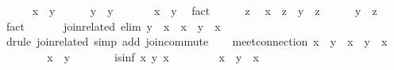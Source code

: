 \begin{isabellebody}
\ \ \ \ \isamarkupfalse%
\ {\isachardoublequoteopen}x\ {\isasymsqsubseteq}\ y{\isachardoublequoteclose}\isanewline
\ \ \ \ \isamarkupfalse%
\ {\isachardoublequoteopen}y\ {\isasymsqsubseteq}\ y{\isachardoublequoteclose}\ \isacommand{{\isachardot}{\isachardot}}\isamarkupfalse%
\isanewline
\ \ \ \ \isamarkupfalse%
\ {\isachardoublequoteopen}x\ {\isasymsqsubseteq}\ y{\isachardoublequoteclose}\ \isamarkupfalse%
\ fact\isanewline
\ \ \ \ \isamarkupfalse%
\ z\ \isamarkupfalse%
\ {\isachardoublequoteopen}x\ {\isasymsqsubseteq}\ z{\isachardoublequoteclose}\ \ {\isachardoublequoteopen}y\ {\isasymsqsubseteq}\ z{\isachardoublequoteclose}\isanewline
\ \ \ \ \isamarkupfalse%
\ {\isachardoublequoteopen}y\ {\isasymsqsubseteq}\ z{\isachardoublequoteclose}\ \isamarkupfalse%
\ fact\isanewline
\ \ \isamarkupfalse%
\isanewline
\isanewline
\ \ \isamarkupfalse%
\ join{\isacharunderscore}related{}\ {\isacharbrackleft}elim{\isacharquery}{\isacharbrackright}{\isacharcolon}\ {\isachardoublequoteopen}y\ {\isasymsqsubseteq}\ x\ {\isasymLongrightarrow}\ x\ {\isasymsqunion}\ y\ {\isacharequal}\ x{\isachardoublequoteclose}\isanewline
\ \ \ \ \isamarkupfalse%
\ {\isacharparenleft}drule\ join{\isacharunderscore}related{\isacharparenright}\ {\isacharparenleft}simp\ add{\isacharcolon}\ join{\isacharunderscore}commute{\isacharparenright}\isanewline
\isanewline
\ \ \isamarkupfalse%
\ meet{\isacharunderscore}connection{\isacharcolon}\ {\isachardoublequoteopen}{\isacharparenleft}x\ {\isasymsqsubseteq}\ y{\isacharparenright}\ {\isacharequal}\ {\isacharparenleft}x\ {\isasymsqinter}\ y\ {\isacharequal}\ x{\isacharparenright}{\isachardoublequoteclose}\isanewline
\ \ \isamarkupfalse%
\isanewline
\ \ \ \ \isamarkupfalse%
\ {\isachardoublequoteopen}x\ {\isasymsqsubseteq}\ y{\isachardoublequoteclose}\isanewline
\ \ \ \ \isamarkupfalse%
\ \isamarkupfalse%
\ {\isachardoublequoteopen}is{\isacharunderscore}inf\ x\ y\ x{\isachardoublequoteclose}\ \isacommand{{\isachardot}{\isachardot}}\isamarkupfalse%
\isanewline
\ \ \ \ \isamarkupfalse%
\ \isamarkupfalse%
\ {\isachardoublequoteopen}x\ {\isasymsqinter}\ y\ {\isacharequal}\ x{\isachardoublequoteclose}\ \isacommand{{\isachardot}{\isachardot}}\isamarkupfalse%
\isanewline
\ \ \isamarkupfalse%
\isanewline
\ \ \ \ \isamarkupfalse%

\end{isabellebody}
